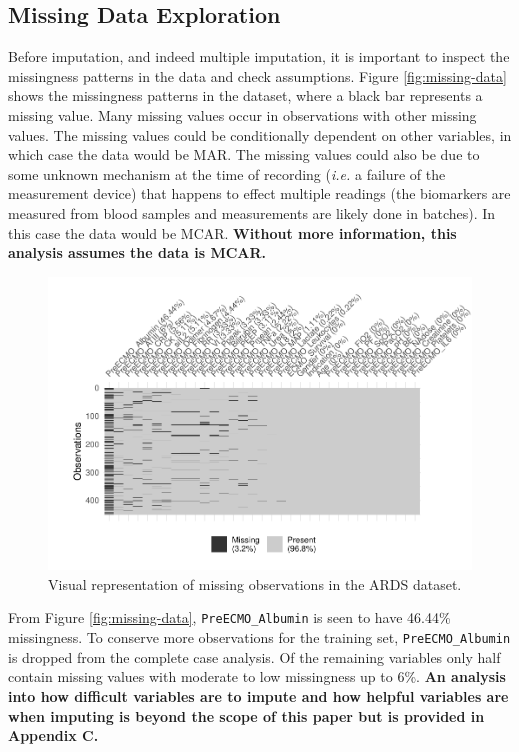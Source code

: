 \documentclass[12pt,]{article}
\begin{document}
\subsection{Missing Data Exploration}\label{missing-data-exploration}

Before imputation, and indeed multiple imputation, it is important to
inspect the missingness patterns in the data and check assumptions.
Figure \ref{fig:missing-data} shows the missingness patterns in the
dataset, where a black bar represents a missing value. Many missing
values occur in observations with other missing values. The missing
values could be conditionally dependent on other variables, in which
case the data would be MAR. The missing values could also be due to some
unknown mechanism at the time of recording (\emph{i.e.} a failure of the
measurement device) that happens to effect multiple readings (the
biomarkers are measured from blood samples and measurements are likely
done in batches). In this case the data would be MCAR. \textbf{Without
more information, this analysis assumes the data is MCAR.}

\begin{figure}[H]

{\centering \includegraphics[width=1\linewidth]{figure/graphics-unnamed-chunk-6-1} 

}

\caption{\label{fig:missing-data}Visual representation of missing observations in the ARDS dataset.}\label{fig:unnamed-chunk-6}
\end{figure}

From Figure \ref{fig:missing-data}, \texttt{PreECMO\_Albumin} is seen to
have 46.44\% missingness. To conserve more observations for the training
set, \texttt{PreECMO\_Albumin} is dropped from the complete case
analysis. Of the remaining variables only half contain missing values
with moderate to low missingness up to 6\%. \textbf{An analysis into how
difficult variables are to impute and how helpful variables are when
imputing is beyond the scope of this paper but is provided in Appendix
C.}
\end{document}
